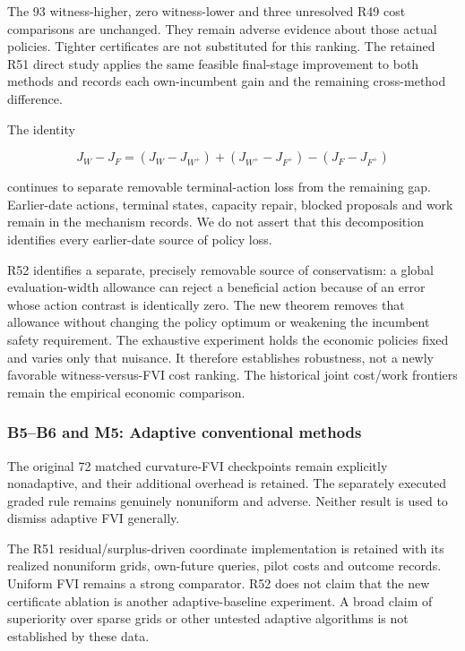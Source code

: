 \documentclass[ecta,nameyear,draft]{econsocart}
\begin{document}
The 93 witness-higher, zero witness-lower and three unresolved R49 cost
comparisons are unchanged. They remain adverse evidence about those
actual policies. Tighter certificates are not substituted for this
ranking. The retained R51 direct study applies the same feasible
final-stage improvement to both methods and records each own-incumbent
gain and the remaining cross-method difference.

The identity

\[
J_W-J_F=(J_W-J_{W^+})+(J_{W^+}-J_{F^+})-(J_F-J_{F^+})
\]

continues to separate removable terminal-action loss from the remaining
gap. Earlier-date actions, terminal states, capacity repair, blocked
proposals and work remain in the mechanism records. We do not assert
that this decomposition identifies every earlier-date source of policy
loss.

R52 identifies a separate, precisely removable source of conservatism: a
global evaluation-width allowance can reject a beneficial action because
of an error whose action contrast is identically zero. The new theorem
removes that allowance without changing the policy optimum or weakening
the incumbent safety requirement. The exhaustive experiment holds the
economic policies fixed and varies only that nuisance. It therefore
establishes robustness, not a newly favorable witness-versus-FVI cost
ranking. The historical joint cost/work frontiers remain the empirical
economic comparison.

\hypertarget{b5b6-and-m5-adaptive-conventional-methods}{%
\subsubsection{B5--B6 and M5: Adaptive conventional
methods}\label{b5b6-and-m5-adaptive-conventional-methods}}

The original 72 matched curvature-FVI checkpoints remain explicitly
nonadaptive, and their additional overhead is retained. The separately
executed graded rule remains genuinely nonuniform and adverse. Neither
result is used to dismiss adaptive FVI generally.

The R51 residual/surplus-driven coordinate implementation is retained
with its realized nonuniform grids, own-future queries, pilot costs and
outcome records. Uniform FVI remains a strong comparator. R52 does not
claim that the new certificate ablation is another adaptive-baseline
experiment. A broad claim of superiority over sparse grids or other
untested adaptive algorithms is not established by these data.
\end{document}
